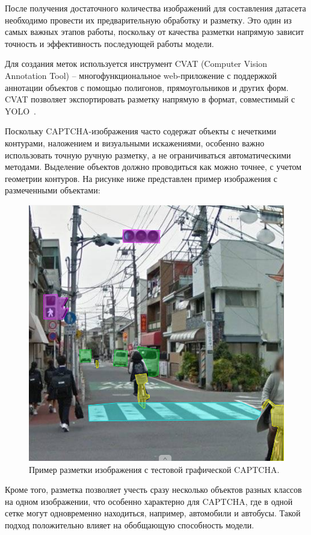 После получения достаточного количества изображений для составления датасета 
необходимо провести их предварительную обработку и разметку. Это один из 
самых важных этапов работы, поскольку от качества разметки напрямую зависит 
точность и эффективность последующей работы модели.

Для создания меток используется инструмент CVAT (Computer Vision Annotation Tool) 
-- многофункциональное web-приложение с поддержкой аннотации объектов с помощью 
полигонов, прямоугольников и других форм. CVAT позволяет экспортировать разметку 
напрямую в формат, совместимый с YOLO~\cite{CVAT}.

Поскольку CAPTCHA-изображения часто содержат объекты с нечеткими контурами, 
наложением и визуальными искажениями, особенно важно использовать точную ручную 
разметку, а не ограничиваться автоматическими методами. Выделение объектов должно 
проводиться как можно точнее, с учетом геометрии контуров. На рисунке ниже 
представлен пример изображения с размеченными объектами:

\begin{figure}[H]
    \centering
    \includegraphics[width=0.9\linewidth]{imgs/imagecaptcha/captcha-poligons.png}
    \caption{Пример разметки изображения с тестовой графической CAPTCHA.}
    \label{fig:mask-captcha}
\end{figure}
\vspace{-0.85cm}

Кроме того, разметка позволяет учесть сразу несколько объектов разных классов на 
одном изображении, что особенно характерно для CAPTCHA, где в одной сетке могут 
одновременно находиться, например, автомобили и автобусы. Такой подход 
положительно влияет на обобщающую способность модели.

